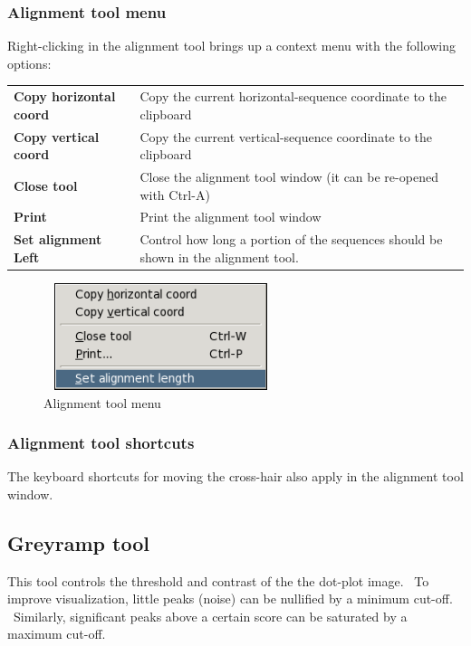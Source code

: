 \documentclass{report}
\begin{document}
\bigskip

{\color[rgb]{0.30980393,0.5058824,0.7411765}\subsubsection[Alignment tool menu ]{Alignment tool menu }}
{Right-clicking in the alignment tool brings up a context menu with the
following options:}

\begin{center}
\tablehead{}
\begin{supertabular}{p{3.853cm}p{9.653cm}}
\bfseries Copy horizontal coord &
 Copy the current horizontal-sequence coordinate
to the clipboard\\
\bfseries Copy vertical coord &
 Copy the current vertical-sequence coordinate
to the clipboard\\
\bfseries Close tool &
 Close the alignment tool window (it can be
re-opened with Ctrl-A)\\
\bfseries Print &
 Print the alignment tool window\\
\bfseries Set alignment Left &
 Control how long a portion of the sequences
should be shown in the alignment tool.\\
\end{supertabular}
\end{center}

\begin{figure}
 \centering
 \color[rgb]{0.30980393,0.5058824,0.7411765}
 \includegraphics[width=6.853cm,height=3.12cm]{img_menu_alignment_tool.png}
 \caption{Alignment tool menu}
\end{figure}

{\color[rgb]{0.30980393,0.5058824,0.7411765}\subsubsection[Alignment tool shortcuts]{Alignment tool shortcuts}}
{The keyboard shortcuts for moving the cross-hair also apply in the
alignment tool window.}

\bigskip
{\color[rgb]{0.30980393,0.5058824,0.7411765}\subsection[Greyramp tool]{Greyramp tool}}
{This tool controls the threshold and contrast of the the dot-plot image.
\ To improve visualization, little peaks (noise) can be nullified by a
minimum cut-off. \ Similarly, significant peaks above a certain score
can be saturated by a maximum cut-off. }
\end{document}
